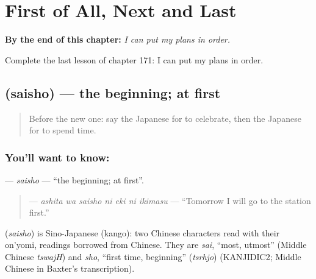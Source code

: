 
\chapter{First of All, Next and Last}
\label{ch:ja-first-of-all-next-and-last}

\begin{chapteropening}
\textbf{By the end of this chapter:} \emph{I can put my plans in order.}

Complete the last lesson of chapter 171: I can put my plans in order.
\end{chapteropening}

\section[\texorpdfstring{\ja{さいしょ} (saisho)}{さいしょ (saisho)}]{ (saisho) — the beginning; at first}

\label{lesson:JA-C171-saisho}



\begin{quote}
Before the new one: say the Japanese for to celebrate, then the Japanese for to spend time.
\end{quote}

\subsection*{You'll want to know: }
\textbf{} — \emph{saisho} — \textquotedblleft{}the beginning; at first\textquotedblright{}.

\begin{quote}
\textbf{   } — \emph{ashita wa saisho ni eki ni ikimasu} — \textquotedblleft{}Tomorrow I will go to the station first.\textquotedblright{}
\end{quote}

\begin{cousinweb}
\textbf{} (\emph{saisho}) is Sino-Japanese (kango): two Chinese characters read with their on'yomi, readings borrowed from Chinese. They are \emph{sai}, \textquotedblleft{}most, utmost\textquotedblright{} (Middle Chinese \emph{tswajH}) and \emph{sho}, \textquotedblleft{}first time, beginning\textquotedblright{} (\emph{tsrhjo}) (KANJIDIC2; Middle Chinese in Baxter's transcription).
\end{cousinweb}

